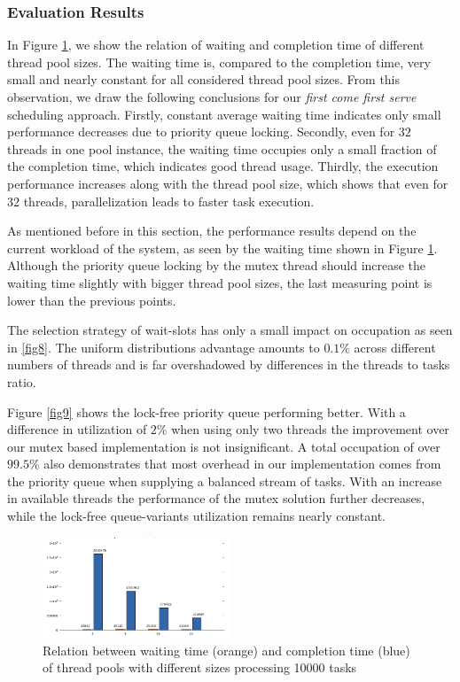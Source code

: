 \documentclass[conference]{IEEEtran}
\begin{document}
\subsubsection{Evaluation Results}
In Figure \ref{fig7}, we show the relation of waiting and completion time of different thread pool sizes. The waiting time is, compared to the completion time, very small and nearly constant for all considered thread pool sizes. From this observation, we draw the following conclusions for our \emph{first come first serve} scheduling approach. Firstly, constant average waiting time indicates only small performance decreases due to priority queue locking. Secondly, even for $32$ threads in one pool instance, the waiting time occupies only a small fraction of the completion time, which indicates good thread usage.  Thirdly, the execution performance increases along with the thread pool size, which shows that even for $32$ threads, parallelization leads to faster task execution. 

As mentioned before in this section, the performance results depend on the current workload of the system, as seen by the waiting time shown in Figure \ref{fig7}. Although the priority queue locking by the mutex thread should increase the waiting time slightly with bigger thread pool sizes, the last measuring point is lower than the previous points. 

The selection strategy of wait-slots has only a small impact on occupation as seen in \ref{fig8}. The uniform distributions advantage amounts to $0.1\%$ across different numbers of threads and is far overshadowed by differences in the threads to tasks ratio.

Figure \ref{fig9} shows the lock-free priority queue performing better. With a difference in utilization of $2\%$ when using only two threads the improvement over our mutex based implementation is not insignificant. A total occupation of over $99.5\%$ also demonstrates that most overhead in our implementation comes from the priority queue when supplying a balanced stream of tasks. With an increase in available threads the performance of the mutex solution further decreases, while the lock-free queue-variants utilization remains nearly constant.

\begin{figure}
	\includegraphics[width=0.5\textwidth]{img/pool_avg.png}
	\caption{Relation between waiting time (orange) and completion time (blue) of thread pools with different sizes processing 10000 tasks}
	\label{fig7}
\end{figure}
\end{document}
